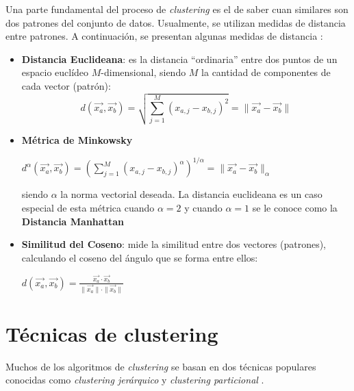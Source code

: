 Una parte fundamental del proceso de \emph{clustering} es el de saber cuan
similares son dos patrones del conjunto de datos. Usualmente, se utilizan medidas
de distancia entre patrones. A continuación, se presentan algunas medidas de
distancia \cite{PSO_0}:
\begin{itemize}
    \item \textbf{Distancia Euclideana}: es la distancia ``ordinaria'' entre dos
puntos de un espacio euclídeo $M$-dimensional, siendo $M$ la cantidad de
componentes de cada vector (patrón):
\begin{equation}\label{mdist: euclidean}
    d(\overrightarrow{x_a}, \overrightarrow{x_b}) = \displaystyle\sqrt{\displaystyle\sum_{j = 1}^{M} (x_{a,j} - x_{b,j})^2} = \|\overrightarrow{x_a} - \overrightarrow{x_b}\|
\end{equation}
    \item \textbf{Métrica de Minkowsky}
\begin{center}
    $d^{\alpha}(\overrightarrow{x_a}, \overrightarrow{x_b}) = \left(\displaystyle\sum_{j = 1}^{M} (x_{a,j} - x_{b,j})^{\alpha}\right)^{1/\alpha} = \|\overrightarrow{x_a} - \overrightarrow{x_b}\|_{\alpha}$
\end{center}
siendo $\alpha$ la norma vectorial deseada.
    La distancia euclideana es un caso especial de esta métrica cuando $\alpha = 2$
y cuando $\alpha = 1$ se le conoce como la \textbf{Distancia Manhattan}
    \item \textbf{Similitud del Coseno}: mide la similitud entre dos
vectores (patrones), calculando el coseno del ángulo que se forma entre ellos:
\begin{center}
    $d(\overrightarrow{x_a}, \overrightarrow{x_b}) = \displaystyle\frac{\overrightarrow{x_{a}} \cdot \overrightarrow{x_{b}}}{\|\overrightarrow{x_a}\| \cdot \|\overrightarrow{x_b}\|}$
\end{center}
\end{itemize}

\section{Técnicas de clustering}
Muchos de los algoritmos de \emph{clustering} se basan en dos
técnicas populares conocidas como  \emph{clustering jerárquico} y
\emph{clustering particional} \cite{PSO_0}.

